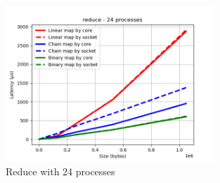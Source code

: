 \begin{figure}[h!]
    \centering
    \includegraphics[width=0.7\textwidth]{../plots/reduce_fixedProcesses24.png}
    \caption{Reduce with 24 processes}
    \label{fig:reduce_fixed_processes_24}
\end{figure}
